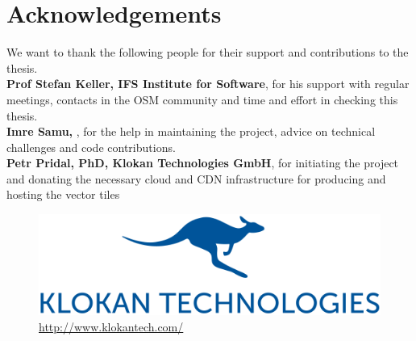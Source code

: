 

\bigskip


\begingroup

\let\clearpage\relax
\let\cleardoublepage\relax
\let\cleardoublepage\relax

\chapter*{Acknowledgements} %

We want to thank the following people for their support and contributions to the thesis.\\

\textbf{Prof Stefan Keller, IFS Institute for Software}, for his support with regular meetings, contacts in the OSM community and time and effort in checking this thesis.\\

\textbf{Imre Samu, \osm{}}, for the help in maintaining the project, advice on technical
challenges and code contributions.\\

\textbf{Petr Pridal, PhD, Klokan Technologies GmbH}, for initiating the project and donating the necessary cloud and CDN infrastructure for producing and hosting the vector tiles\\

\begin{figure}[H]
  \centering
  \includegraphics[scale=0.3]{images/klokantech_logo.png}
  \caption*{\url{http://www.klokantech.com/}}
\end{figure}
\endgroup



